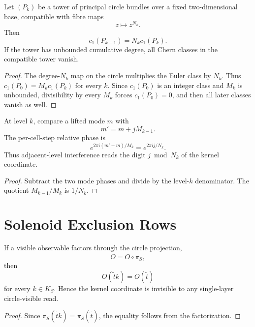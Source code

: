 \begin{theorem}
\label{thm:innovation-input-solenoid-chern-obstruction}
Let $(P_k)$ be a tower of principal circle bundles over a fixed
two-dimensional base, compatible with fibre maps
$$
z\longmapsto z^{N_k}.
$$
Then
$$
c_1(P_{k-1})=N_kc_1(P_k).
$$
If the tower has unbounded cumulative degree, all Chern classes in the
compatible tower vanish.
\end{theorem}

\begin{proof}
The degree-$N_k$ map on the circle multiplies the Euler class by $N_k$.
Thus $c_1(P_0)=M_kc_1(P_k)$ for every $k$. Since $c_1(P_0)$ is an
integer class and $M_k$ is unbounded, divisibility by every $M_k$ forces
$c_1(P_0)=0$, and then all later classes vanish as well.
\end{proof}

\begin{theorem}
\label{thm:innovation-input-solenoid-beat-frequency-digit-read}
At level $k$, compare a lifted mode $m$ with
$$
m'=m+jM_{k-1}.
$$
The per-cell-step relative phase is
$$
e^{2\pi i(m'-m)/M_k}=e^{2\pi ij/N_k}.
$$
Thus adjacent-level interference reads the digit $j\bmod N_k$ of the
kernel coordinate.
\end{theorem}

\begin{proof}
Subtract the two mode phases and divide by the level-$k$ denominator.
The quotient $M_{k-1}/M_k$ is $1/N_k$.
\end{proof}

\section{Solenoid Exclusion Rows}
\label{sec:innovation-input-solenoid-exclusion-rows}

\begin{theorem}
\label{thm:innovation-input-solenoid-kernel-blindness}
If a visible observable factors through the circle projection,
$$
O=\overline O\circ\pi_S,
$$
then
$$
O(\tilde t k)=O(\tilde t)
$$
for every $k\in K_S$. Hence the kernel coordinate is invisible to any
single-layer circle-visible read.
\end{theorem}

\begin{proof}
Since $\pi_S(\tilde t k)=\pi_S(\tilde t)$, the equality follows from the
factorization.
\end{proof}

